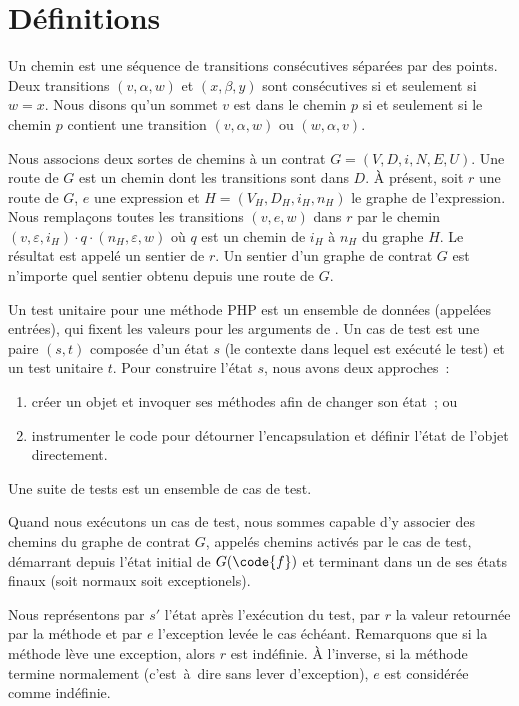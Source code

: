 \section{Définitions}
\label{section:test:definitions}

Un {\strong chemin} est une séquence de transitions consécutives séparées par
des points. Deux transitions $(v, \alpha, w)$ et $(x, \beta, y)$ sont
consécutives si et seulement si $w = x$. Nous disons qu'un sommet $v$ {\strong
est dans} le chemin $p$ si et seulement si le chemin $p$ contient une transition
$(v, \alpha, w)$ ou $(w, \alpha, v)$.

Nous associons deux sortes de chemins à un contrat $G = (V, D, i, N, E, U)$. Une
{\strong route} de $G$ est un chemin dont les transitions sont dans $D$. À
présent, soit $r$ une route de $G$, $e$ une expression et $H = (V_H, D_H, i_H,
n_H)$ le graphe de l'expression. Nous remplaçons toutes les transitions $(v, e,
w)$ dans $r$ par le chemin $(v, \varepsilon, i_H) \cdot q \cdot (n_H,
\varepsilon, w)$ où $q$ est un chemin de $i_H$ à $n_H$ du graphe $H$. Le
résultat est appelé un {\strong sentier} de $r$. Un sentier d'un graphe de
contrat $G$ est n'importe quel sentier obtenu depuis une route de $G$.

Un {\strong test unitaire} pour une méthode PHP  est un ensemble de
données (appelées entrées), qui fixent les valeurs pour les
arguments de . Un {\strong cas de test} est une paire $(s, t)$ composée
d'un état $s$ (le contexte dans lequel est exécuté le test) et un test unitaire
$t$. Pour construire l'état $s$, nous avons deux approches~:
%
\begin{enumerate}

\item créer un objet et invoquer ses méthodes afin de changer son état~; ou

\item instrumenter le code pour détourner l'encapsulation et définir l'état de
l'objet directement.

\end{enumerate}
%
Une {\strong suite de tests} est un ensemble de cas de test.

Quand nous exécutons un cas de test, nous sommes capable d'y associer des
chemins du graphe de contrat $G$, appelés chemins {\strong activés par} le cas
de test, démarrant depuis l'état initial de $G(\code{f})$ et terminant dans un
de ses états finaux (soit normaux soit exceptionels).

Nous représentons par $s'$ l'état après l'exécution du test, par $r$ la valeur
retournée par la méthode  et par $e$ l'exception levée le cas échéant.
Remarquons que si la méthode lève une exception, alors $r$ est indéfinie. À
l'inverse, si la méthode termine normalement (c'est~à~dire sans lever
d'exception), $e$ est considérée comme indéfinie.

